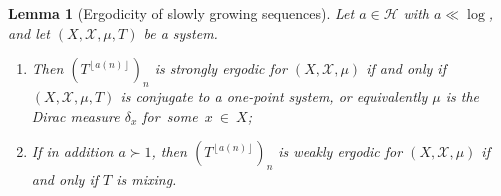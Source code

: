 \documentclass[11pt]{amsart}
\newtheorem{lemma}{Lemma}[section]
\theoremstyle{definition}
\newcommand{\CH}{{\mathcal H}}
\newcommand{\CX}{{\mathcal X}}
\newcommand{\1}{{\mathbf{1}}}
\newcommand{\floor}[1]{{\left \lfloor #1 \right \rfloor}}
\begin{document}
\begin{lemma}[Ergodicity of slowly growing sequences]\label{L: slowly growing}
    Let $a\in\CH$ with $a\ll \log$, and let $(X, \CX, \mu, T)$ be a system.  
    \begin{enumerate}
        \item Then $(T^{\floor{a(n)}})_n$ is strongly ergodic for $(X, \CX, \mu)$ if and only if $(X, \CX, \mu, T)$ is conjugate to a one-point system, or equivalently $\mu$ is the Dirac measure $\delta_x$ for~some~$x~\in~X$;
        \item If in addition $a\succ 1$, then $(T^{\floor{a(n)}})_n$ is weakly ergodic for $(X, \CX, \mu)$ if and only if $T$ is mixing.
    \end{enumerate}
\end{lemma}
\end{document}
